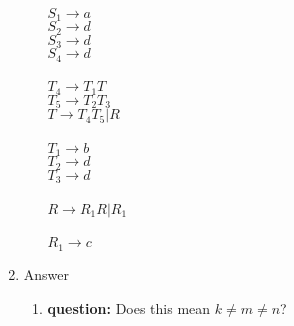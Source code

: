 \documentclass{article}
\begin{document}
\begin{enumerate}
\begin{enumerate}
				$S_1 \rightarrow a$\\
				$S_2 \rightarrow d$\\$S_3 \rightarrow d$\\$S_4 \rightarrow d$\\\\

				$T_4 \rightarrow T_1T$\\
				$T_5 \rightarrow T_2T_3$\\
				$T \rightarrow T_4T_5 | R$\\\\

				$T_1 \rightarrow b$\\ $T_2 \rightarrow d$\\$T_3 \rightarrow d$\\\\

				$R \rightarrow R_1R | R_1$\\\\
				$R_1 \rightarrow c$\\
			\end{enumerate}
		\item Answer \begin{enumerate}
			\item \textbf{question:}  Does this mean $k \neq m \neq n$?
			\end{enumerate}
	\end{enumerate}
\end{document}
